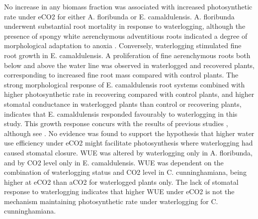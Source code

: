 \documentclass[12pt,a4paper]{memoir}
\begin{document}
No increase in any biomass fraction was associated with increased photosynthetic rate under eCO2 for either A. floribunda or E. camaldulensis. A. floribunda underwent substantial root mortality in response to waterlogging, although the presence of spongy white aerenchymous adventitious roots indicated a degree of morphological adaptation to anoxia \citep{Evans2004}. Conversely, waterlogging stimulated fine root growth in E. camaldulensis. A proliferation of fine aerenchymous roots both below and above the water line was observed in waterlogged and recovered plants, corresponding to increased fine root mass compared with control plants. The strong morphological response of E. camaldulensis root systems combined with higher photosynthetic rate in recovering compared with control plants, and higher stomatal conductance in waterlogged plants than control or recovering plants, indicates that E. camaldulensis responded favourably to waterlogging in this study. This growth response concurs with the results of previous studies \citep{Sena-Gomes1980, Marcar1993}, although see \citep{Kogawara2006}. No evidence was found to support the hypothesis that higher water use efficiency under eCO2 might facilitate photosynthesis where waterlogging had caused stomatal closure. WUE was altered by waterlogging only in A. floribunda, and by CO2 level only in E. camaldulensis. WUE was dependent on the combination of waterlogging status and CO2 level in C. cunninghamiana, being higher at eCO2 than aCO2 for waterlogged plants only. The lack of stomatal response to waterlogging indicates that higher WUE under eCO2 is not the mechanism maintaining photosynthetic rate under waterlogging for C. cunninghamiana. 
\end{document}
